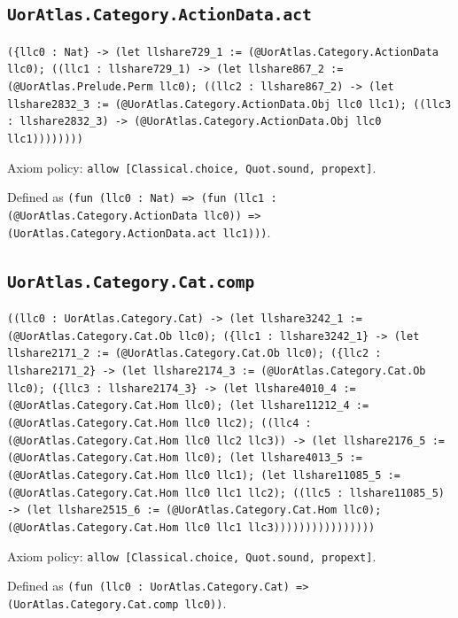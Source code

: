 \documentclass[11pt]{article}
\begin{document}
\subsection*{\texttt{UorAtlas.Category.ActionData.act}}
\noindent\texttt{(\{llc0 : Nat\} -> (let llshare729\_1 := (@UorAtlas.Category.ActionData llc0); ((llc1 : llshare729\_1) -> (let llshare867\_2 := (@UorAtlas.Prelude.Perm llc0); ((llc2 : llshare867\_2) -> (let llshare2832\_3 := (@UorAtlas.Category.ActionData.Obj llc0 llc1); ((llc3 : llshare2832\_3) -> (@UorAtlas.Category.ActionData.Obj llc0 llc1))))))))}\par
\noindent Axiom policy: \texttt{allow [Classical.choice, Quot.sound, propext]}.\par
\noindent Defined as \texttt{(fun (llc0 : Nat) => (fun (llc1 : (@UorAtlas.Category.ActionData llc0)) => (UorAtlas.Category.ActionData.act llc1)))}.\par
\subsection*{\texttt{UorAtlas.Category.Cat.comp}}
\noindent\texttt{((llc0 : UorAtlas.Category.Cat) -> (let llshare3242\_1 := (@UorAtlas.Category.Cat.Ob llc0); (\{llc1 : llshare3242\_1\} -> (let llshare2171\_2 := (@UorAtlas.Category.Cat.Ob llc0); (\{llc2 : llshare2171\_2\} -> (let llshare2174\_3 := (@UorAtlas.Category.Cat.Ob llc0); (\{llc3 : llshare2174\_3\} -> (let llshare4010\_4 := (@UorAtlas.Category.Cat.Hom llc0); (let llshare11212\_4 := (@UorAtlas.Category.Cat.Hom llc0 llc2); ((llc4 : (@UorAtlas.Category.Cat.Hom llc0 llc2 llc3)) -> (let llshare2176\_5 := (@UorAtlas.Category.Cat.Hom llc0); (let llshare4013\_5 := (@UorAtlas.Category.Cat.Hom llc0 llc1); (let llshare11085\_5 := (@UorAtlas.Category.Cat.Hom llc0 llc1 llc2); ((llc5 : llshare11085\_5) -> (let llshare2515\_6 := (@UorAtlas.Category.Cat.Hom llc0); (@UorAtlas.Category.Cat.Hom llc0 llc1 llc3))))))))))))))))}\par
\noindent Axiom policy: \texttt{allow [Classical.choice, Quot.sound, propext]}.\par
\noindent Defined as \texttt{(fun (llc0 : UorAtlas.Category.Cat) => (UorAtlas.Category.Cat.comp llc0))}.\par
\end{document}
